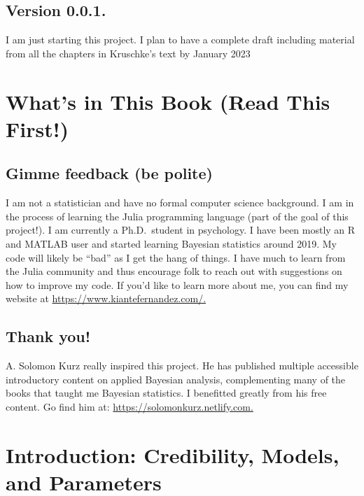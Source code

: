 \documentclass[
  letterpaper,
  DIV=11,
  numbers=noendperiod]{scrreprt}
\begin{document}
\hypertarget{version-0.0.1.}{%
\section*{Version 0.0.1.}\label{version-0.0.1.}}

I am just starting this project. I plan to have a complete draft
including material from all the chapters in Kruschke's text by January
2023


\hypertarget{whats-in-this-book-read-this-first}{%
\chapter{What's in This Book (Read This
First!)}\label{whats-in-this-book-read-this-first}}

\hypertarget{gimme-feedback-be-polite}{%
\section{Gimme feedback (be polite)}\label{gimme-feedback-be-polite}}

I am not a statistician and have no formal computer science background.
I am in the process of learning the Julia programming language (part of
the goal of this project!). I am currently a Ph.D.~student in
psychology. I have been mostly an R and MATLAB user and started learning
Bayesian statistics around 2019. My code will likely be ``bad'' as I get
the hang of things. I have much to learn from the Julia community and
thus encourage folk to reach out with suggestions on how to improve my
code. If you'd like to learn more about me, you can find my website at
\href{https://www.kiantefernandez.com/}{https://www.kiantefernandez.com/.}

\hypertarget{thank-you}{%
\section{Thank you!}\label{thank-you}}

A. Solomon Kurz really inspired this project. He has published multiple
accessible introductory content on applied Bayesian analysis,
complementing many of the books that taught me Bayesian statistics. I
benefitted greatly from his free content. Go find him at:
\url{https://solomonkurz.netlify.com.}


\hypertarget{introduction-credibility-models-and-parameters}{%
\chapter{Introduction: Credibility, Models, and
Parameters}\label{introduction-credibility-models-and-parameters}}
\end{document}
